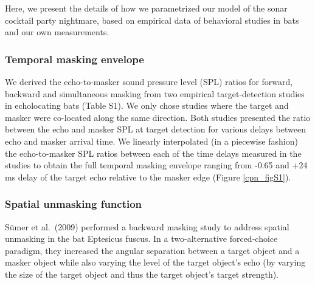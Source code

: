 \documentclass[
]{book}
\begin{document}
Here, we present the details of how we parametrized our model of the sonar cocktail party nightmare, based on empirical data of behavioral studies in bats and our own measurements.

\hypertarget{temporal-masking-envelope}{%
\subsubsection{\texorpdfstring{Temporal masking envelope \label{cpn_tempmasking}}{Temporal masking envelope }}\label{temporal-masking-envelope}}

We derived the echo-to-masker sound pressure level (SPL) ratios for forward, backward and simultaneous masking from two empirical target-detection studies in echolocating bats (Table S1). We only chose studies where the target and masker were co-located along the same direction. Both studies presented the ratio between the echo and masker SPL at target detection for various delays between
echo and masker arrival time. We linearly interpolated (in a piecewise fashion) the echo-to-masker SPL ratios between each of the time delays measured in the studies to obtain the full temporal masking envelope ranging from -0.65 and +24 ms delay of the target echo relative to the masker edge (Figure \ref{cpn_figS1}).

\hypertarget{spatial-unmasking-function}{%
\subsubsection{\texorpdfstring{Spatial unmasking function \label{cpn_spatiunmasking}}{Spatial unmasking function }}\label{spatial-unmasking-function}}

Sümer et al.~(2009) performed a backward masking study to address spatial unmasking in the bat Eptesicus fuscus. In a two-alternative forced-choice paradigm, they increased the angular separation between a target object and a masker object while also varying the level of the target object's echo (by varying the size of the target object and thus the target object's target strength).
\end{document}
